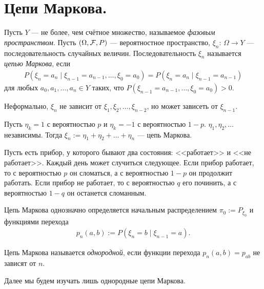 \documentclass[../main.tex]{subfiles}
\begin{document}
\section{Цепи Маркова.}

\begin{df}
 Пусть $ Y $ --- не более, чем счётное множество, называемое \textit{фазовым пространством}. Пусть $ (\Omega,\mathcal F,P) $ --- вероятностное пространство, $ \xi_n \colon\, \Omega \to Y $ --- последовательность случайных величин. Последовательность $ \xi_n $ называется \textit{цепью Маркова}, если 
 \begin{align*}
  P(\xi_n = a_n \mid \xi_{n-1} = a_{n-1}, \ldots, \xi_0 = a_0) = P(\xi_n = a_n \mid \xi_{n-1} = a_{n-1})
 \end{align*} для любых $ a_0, a_1, \ldots, a_n \in Y $ таких, что $ P(\xi_{n-1} = a_{n-1}, \ldots, \xi_0 = a_0) > 0 $.

 Неформально, $ \xi_n $ не зависит от $ \xi_1, \xi_2, \ldots, \xi_{n-2} $, но может зависеть от $ \xi_{n-1} $.
\end{df}
\begin{exmpl}
 Пусть $ \eta_k = 1 $ с вероятностью $ p $ и $ \eta_k = -1 $  с вероятностью $ 1-p $. $ \eta_1, \eta_2, \ldots $  независимы. Тогда $ \xi_n := \eta_1 + \eta_2 + \ldots + \eta_n $ --- цепь Маркова.
\end{exmpl}
\begin{exmpl}
 Пусть есть прибор, у которого бывают два состояния: <<работает>> и <<не работает>>. Каждый день может случиться следующее. Если прибор работает, то с вероятностью $ p $ он сломаться, а с вероятностью $ 1-p $ он продолжит работать. Если прибор не работает, то с вероятностью $ q $ его починить, а с вероятностью $ 1-q $ он останется сломанным.
\end{exmpl}
\begin{remrk}
 Цепь Маркова однозначно определяется начальным распределением $ \pi_0 := P_{\xi_0} $ и функциями перехода
 \begin{align*}
  p_n(a,b) := P(\xi_n = b \mid \xi_{n-1} = a).
 \end{align*}
\end{remrk}

\begin{df}
 Цепь Маркова называется \textit{однородной}, если функции перехода $ p_n(a,b) = p_{ab} $ не зависят от $ n $.
\end{df}

Далее мы будем изучать лишь однородные цепи Маркова.
\end{document}
